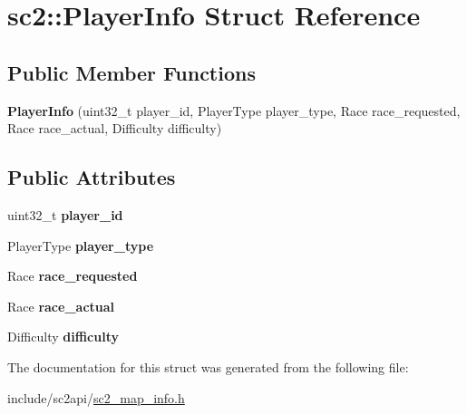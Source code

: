 \hypertarget{structsc2_1_1_player_info}{}\section{sc2\+:\+:Player\+Info Struct Reference}
\label{structsc2_1_1_player_info}
\subsection*{Public Member Functions}
\begin{DoxyCompactItemize}
\item 
\mbox{\label{structsc2_1_1_player_info_a5cf86324fd08dd4eea6ae7d49b82e1af}} 
{\bfseries Player\+Info} (uint32\+\_\+t player\+\_\+id, Player\+Type player\+\_\+type, Race race\+\_\+requested, Race race\+\_\+actual, Difficulty difficulty)
\end{DoxyCompactItemize}
\subsection*{Public Attributes}
\begin{DoxyCompactItemize}
\item 
\mbox{\label{structsc2_1_1_player_info_ae606156d52b4a26e017182de11f70619}} 
uint32\+\_\+t {\bfseries player\+\_\+id}
\item 
\mbox{\label{structsc2_1_1_player_info_a3502bb85e219bdbc214f9b14fa119fe6}} 
Player\+Type {\bfseries player\+\_\+type}
\item 
\mbox{\label{structsc2_1_1_player_info_ac475ad13982b2c08d1deeefeac0b4e2f}} 
Race {\bfseries race\+\_\+requested}
\item 
\mbox{\label{structsc2_1_1_player_info_a259d10f8f0e48898da86ef18f5b7f36a}} 
Race {\bfseries race\+\_\+actual}
\item 
\mbox{\label{structsc2_1_1_player_info_a78b08122c78a2323a8b4d501e795fa2d}} 
Difficulty {\bfseries difficulty}
\end{DoxyCompactItemize}


The documentation for this struct was generated from the following file\+:\begin{DoxyCompactItemize}
\item 
include/sc2api/\hyperlink{sc2__map__info_8h}{sc2\+\_\+map\+\_\+info.\+h}\end{DoxyCompactItemize}
